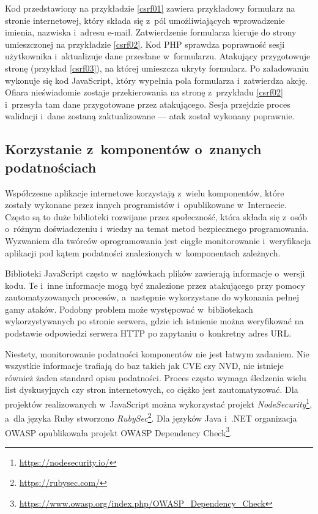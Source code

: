 \documentclass[12pt,a4paper,polish,thesis]{dcsbook}
\begin{document}
Kod przedstawiony na przykładzie \ref{csrf01} zawiera przykładowy formularz na stronie internetowej, który składa się z~pól umożliwiających wprowadzenie imienia, nazwiska i~adresu e-mail. Zatwierdzenie formularza kieruje do strony umieszczonej na przykładzie \ref{csrf02}. Kod PHP sprawdza poprawność sesji użytkownika i~aktualizuje dane przesłane w~formularzu. Atakujący przygotowuje stronę (przykład \ref{csrf03}), na której umieszcza ukryty formularz. Po załadowaniu wykonuje się kod JavaScript, który wypełnia pola formularza i~zatwierdza akcję. Ofiara nieświadomie zostaje przekierowania na stronę z~przykładu \ref{csrf02} i~przesyła tam dane przygotowane przez atakującego. Sesja przejdzie proces walidacji i~dane zostaną zaktualizowane --- atak został wykonany poprawnie.

\subsection{Korzystanie z~komponentów o~znanych podatnościach}
Współczesne aplikacje internetowe korzystają z~wielu komponentów, które zostały wykonane przez innych programistów i~opublikowane w~Internecie. Często są to duże biblioteki rozwijane przez społeczność, która składa się z~osób o~różnym doświadczeniu i~wiedzy na temat metod bezpiecznego programowania. Wyzwaniem dla twórców oprogramowania jest ciągłe monitorowanie i~weryfikacja aplikacji pod kątem podatności znalezionych w~komponentach zależnych. 

Biblioteki JavaScript często w~nagłówkach plików zawierają informacje o~wersji kodu. Te i~inne informacje mogą być znalezione przez atakującego przy pomocy zautomatyzowanych procesów, a~następnie wykorzystane do wykonania pełnej gamy ataków. Podobny problem może występować w~bibliotekach wykorzystywanych po stronie serwera, gdzie ich istnienie można weryfikować na podstawie odpowiedzi serwera HTTP po zapytaniu o~konkretny adres URL. 

Niestety, monitorowanie podatności komponentów nie jest łatwym zadaniem. Nie wszystkie informacje trafiają do baz takich jak CVE czy NVD, nie istnieje również żaden standard opisu podatności. Proces często wymaga śledzenia wielu list dyskusyjnych czy stron internetowych, co ciężko jest zautomatyzować. Dla projektów realizowanych w~JavaScript można wykorzystać projekt \textit{NodeSecurity}\footnote{\url{https://nodesecurity.io/}}, a~dla języka Ruby stworzono \textit{RubySec}\footnote{\url{https://rubysec.com/}}. Dla języków Java i~.NET organizacja OWASP opublikowała projekt OWASP Dependency Check\footnote{\url{https://www.owasp.org/index.php/OWASP\_Dependency\_Check}}.
\end{document}
